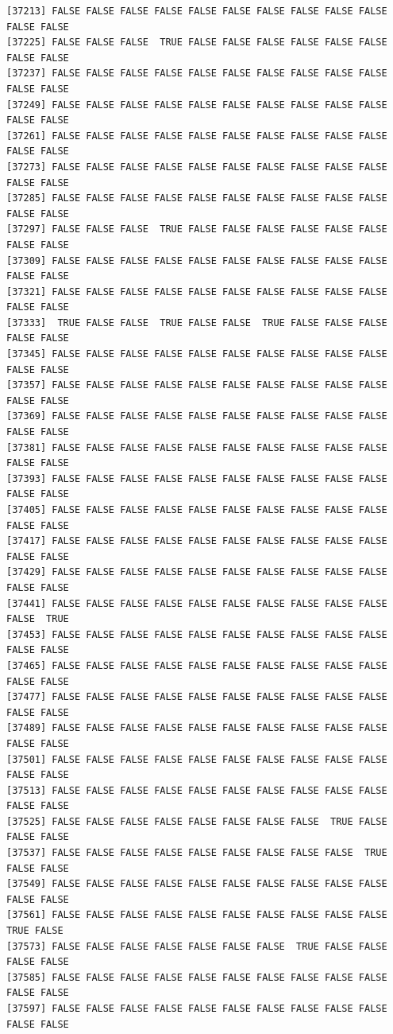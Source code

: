 \documentclass[
  a4paper,
  DIV=11,
  numbers=noendperiod]{scrartcl}
\begin{document}
\begin{verbatim}
[37213] FALSE FALSE FALSE FALSE FALSE FALSE FALSE FALSE FALSE FALSE FALSE FALSE
[37225] FALSE FALSE FALSE  TRUE FALSE FALSE FALSE FALSE FALSE FALSE FALSE FALSE
[37237] FALSE FALSE FALSE FALSE FALSE FALSE FALSE FALSE FALSE FALSE FALSE FALSE
[37249] FALSE FALSE FALSE FALSE FALSE FALSE FALSE FALSE FALSE FALSE FALSE FALSE
[37261] FALSE FALSE FALSE FALSE FALSE FALSE FALSE FALSE FALSE FALSE FALSE FALSE
[37273] FALSE FALSE FALSE FALSE FALSE FALSE FALSE FALSE FALSE FALSE FALSE FALSE
[37285] FALSE FALSE FALSE FALSE FALSE FALSE FALSE FALSE FALSE FALSE FALSE FALSE
[37297] FALSE FALSE FALSE  TRUE FALSE FALSE FALSE FALSE FALSE FALSE FALSE FALSE
[37309] FALSE FALSE FALSE FALSE FALSE FALSE FALSE FALSE FALSE FALSE FALSE FALSE
[37321] FALSE FALSE FALSE FALSE FALSE FALSE FALSE FALSE FALSE FALSE FALSE FALSE
[37333]  TRUE FALSE FALSE  TRUE FALSE FALSE  TRUE FALSE FALSE FALSE FALSE FALSE
[37345] FALSE FALSE FALSE FALSE FALSE FALSE FALSE FALSE FALSE FALSE FALSE FALSE
[37357] FALSE FALSE FALSE FALSE FALSE FALSE FALSE FALSE FALSE FALSE FALSE FALSE
[37369] FALSE FALSE FALSE FALSE FALSE FALSE FALSE FALSE FALSE FALSE FALSE FALSE
[37381] FALSE FALSE FALSE FALSE FALSE FALSE FALSE FALSE FALSE FALSE FALSE FALSE
[37393] FALSE FALSE FALSE FALSE FALSE FALSE FALSE FALSE FALSE FALSE FALSE FALSE
[37405] FALSE FALSE FALSE FALSE FALSE FALSE FALSE FALSE FALSE FALSE FALSE FALSE
[37417] FALSE FALSE FALSE FALSE FALSE FALSE FALSE FALSE FALSE FALSE FALSE FALSE
[37429] FALSE FALSE FALSE FALSE FALSE FALSE FALSE FALSE FALSE FALSE FALSE FALSE
[37441] FALSE FALSE FALSE FALSE FALSE FALSE FALSE FALSE FALSE FALSE FALSE  TRUE
[37453] FALSE FALSE FALSE FALSE FALSE FALSE FALSE FALSE FALSE FALSE FALSE FALSE
[37465] FALSE FALSE FALSE FALSE FALSE FALSE FALSE FALSE FALSE FALSE FALSE FALSE
[37477] FALSE FALSE FALSE FALSE FALSE FALSE FALSE FALSE FALSE FALSE FALSE FALSE
[37489] FALSE FALSE FALSE FALSE FALSE FALSE FALSE FALSE FALSE FALSE FALSE FALSE
[37501] FALSE FALSE FALSE FALSE FALSE FALSE FALSE FALSE FALSE FALSE FALSE FALSE
[37513] FALSE FALSE FALSE FALSE FALSE FALSE FALSE FALSE FALSE FALSE FALSE FALSE
[37525] FALSE FALSE FALSE FALSE FALSE FALSE FALSE FALSE  TRUE FALSE FALSE FALSE
[37537] FALSE FALSE FALSE FALSE FALSE FALSE FALSE FALSE FALSE  TRUE FALSE FALSE
[37549] FALSE FALSE FALSE FALSE FALSE FALSE FALSE FALSE FALSE FALSE FALSE FALSE
[37561] FALSE FALSE FALSE FALSE FALSE FALSE FALSE FALSE FALSE FALSE  TRUE FALSE
[37573] FALSE FALSE FALSE FALSE FALSE FALSE FALSE  TRUE FALSE FALSE FALSE FALSE
[37585] FALSE FALSE FALSE FALSE FALSE FALSE FALSE FALSE FALSE FALSE FALSE FALSE
[37597] FALSE FALSE FALSE FALSE FALSE FALSE FALSE FALSE FALSE FALSE FALSE FALSE

\end{verbatim}
\end{document}
